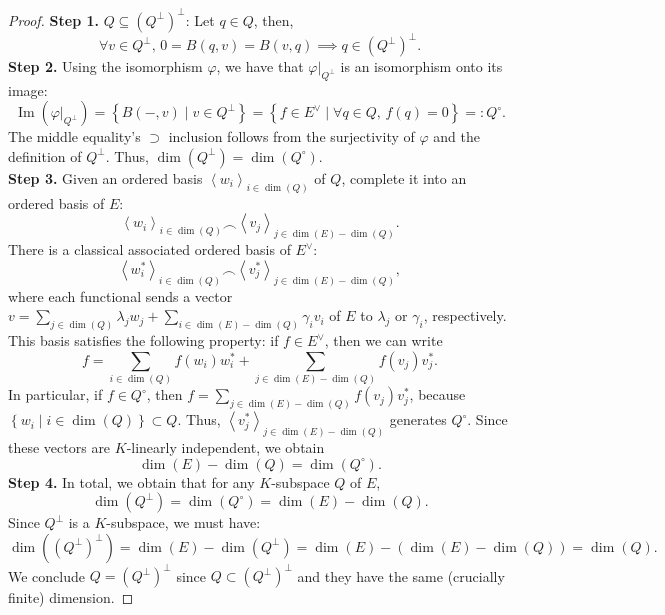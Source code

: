 \documentclass[11pt, a4paper, oneside]{article}
\theoremstyle{remark}
\theoremstyle{lemma}
\begin{document}
\begin{proof}
    \textbf{Step 1.} \( Q \subseteq \left(Q^{\perp}\right)^{\perp} \): Let \( q \in Q \), then,
    \[
    \forall v \in Q^\perp, \, 0=B\left(q, v\right) = B\left(v,q\right) \implies q \in \left(Q^{\perp}\right)^{\perp}.
    \]
    \textbf{Step 2.} Using the isomorphism \( \varphi \), we have that \( \varphi|_{Q^{\perp}} \) is an isomorphism onto its image:
    \[
    \operatorname{Im}\left(\varphi|_{Q^{\perp}}\right) = \left\{ B\left(-, v\right) \mid v \in Q^{\perp} \right\} = \left\{ f \in E^{\vee} \mid \forall q \in Q, \, f\left(q\right) = 0 \right\} =: Q^{\circ}.
    \]
    The middle equality's \( \supset \) inclusion follows from the surjectivity of \( \varphi \) and the definition of \( Q^{\perp} \). Thus, \( \dim\left(Q^{\perp}\right) = \dim\left(Q^{\circ}\right) \).\\
    \textbf{Step 3.} Given an ordered basis \( \left\langle w_i\right\rangle_{i \in \dim\left(Q\right)} \) of \( Q \), complete it into an ordered basis of \( E \):
    \[
    \left\langle w_i\right\rangle_{i \in \dim\left(Q\right)} \frown \left\langle v_j\right\rangle_{j \in \dim\left(E\right) - \dim\left(Q\right)}.
    \]
    There is a classical associated ordered basis of \( E^{\vee} \):
    \[
    \left\langle w_i^*\right\rangle_{i \in \dim\left(Q\right)} \frown \left\langle v_j^*\right\rangle_{j \in \dim\left(E\right) - \dim\left(Q\right)},
    \]
    where each functional sends a vector \( v = \sum_{j \in \dim\left(Q\right)} \lambda_j w_j + \sum_{i \in \dim\left(E\right) - \dim\left(Q\right)} \gamma_i v_i \) of \( E \) to \( \lambda_j \) or \( \gamma_i \), respectively. This basis satisfies the following property: if \( f \in E^{\vee} \), then we can write
    \[
    f = \sum_{i \in \dim\left(Q\right)} f\left(w_i\right) w_i^* + \sum_{j \in \dim\left(E\right) - \dim\left(Q\right)} f\left(v_j\right) v_j^*.
    \]
    In particular, if \( f \in Q^{\circ} \), then \( f = \sum_{j \in \dim\left(E\right) - \dim\left(Q\right)} f\left(v_j\right) v_j^* \), because \( \left\{w_i \mid i \in \dim\left(Q\right)\right\} \subset Q \). Thus, \( \left\langle v_j^*\right\rangle_{j \in \dim\left(E\right) - \dim\left(Q\right)} \) generates \( Q^{\circ} \). Since these vectors are \( K \)-linearly independent, we obtain
    \[
    \dim\left(E\right) - \dim\left(Q\right) = \dim\left(Q^{\circ}\right).
    \]  
    \textbf{Step 4.} In total, we obtain that for any \( K \)-subspace \( Q \) of \( E \),
    \[
    \dim\left(Q^{\perp}\right) = \dim\left(Q^{\circ}\right) = \dim\left(E\right) - \dim\left(Q\right).
    \]
    Since \( Q^{\perp} \) is a \( K \)-subspace, we must have:
    \[
    \dim\left(\left(Q^{\perp}\right)^{\perp}\right) = \dim\left(E\right) - \dim\left(Q^{\perp}\right) = \dim\left(E\right) - \left(\dim\left(E\right) - \dim\left(Q\right)\right) = \dim\left(Q\right).
    \]
    We conclude \( Q = \left(Q^{\perp}\right)^{\perp} \) since \( Q \subset \left(Q^{\perp}\right)^{\perp} \) and they have the same (crucially finite) dimension.
\end{proof}
\end{document}
